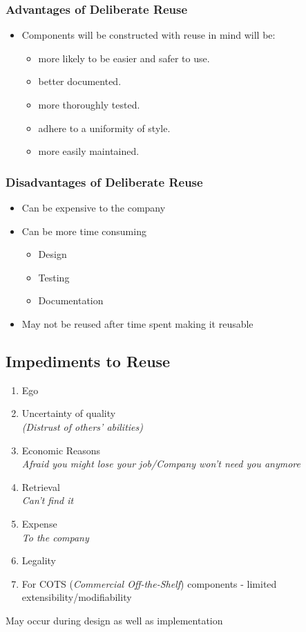 \documentclass{report}
\begin{document}
				\subsubsection{Advantages of Deliberate Reuse}
					\begin{itemize}
						\item Components will be constructed with reuse in mind will be:
							\begin{itemize}
								\item more likely to be easier and safer to use.
								\item better documented.
								\item more thoroughly tested.
								\item adhere to a uniformity of style.
								\item more easily maintained.
							\end{itemize}
					\end{itemize}
				\subsubsection{Disadvantages of Deliberate Reuse}
					\begin{itemize}
						\item Can be expensive to the company
						\item Can be more time consuming
							\begin{itemize}
								\item Design
								\item Testing
								\item Documentation
							\end{itemize}
						\item May not be reused after time spent making it reusable
					\end{itemize}
			\subsection{Impediments to Reuse}
				\begin{enumerate}
					\item Ego
					\item Uncertainty of quality\\
						\textit{(Distrust of others' abilities)}
					\item Economic Reasons\\
						\textit{Afraid you might lose your job/Company won't need you anymore}
					\item Retrieval\\
						\textit{Can't find it}
					\item Expense\\
						\textit{To the company}
					\item Legality
					\item For COTS (\textit{Commercial Off-the-Shelf}) components - limited extensibility/modifiability
				\end{enumerate}
				May occur during design as well as implementation
\end{document}
